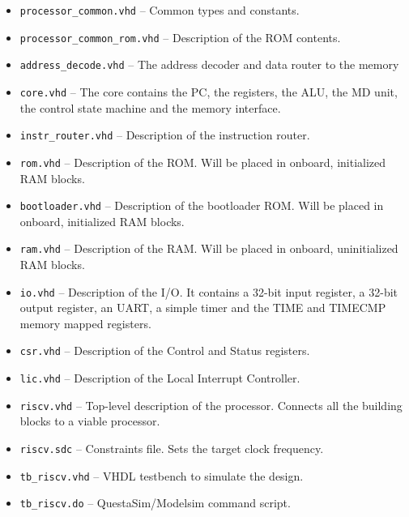\documentclass[12pt]{article}
\begin{document}
\begin{itemize}
\item \lstinline|processor_common.vhd| -- Common types and constants.
\item \lstinline|processor_common_rom.vhd| -- Description of the ROM contents.
\item \lstinline|address_decode.vhd| -- The address decoder and data router to the memory \item \lstinline|core.vhd| -- The core contains the PC, the registers, the ALU, the MD unit, the control state machine and the memory interface.
\item \lstinline|instr_router.vhd| -- Description of the instruction router.
\item \lstinline|rom.vhd| -- Description of the ROM. Will be placed in onboard, initialized RAM blocks. 
\item \lstinline|bootloader.vhd| -- Description of the bootloader ROM. Will be placed in onboard, initialized RAM blocks. 
\item \lstinline|ram.vhd| -- Description of the RAM. Will be placed in onboard, uninitialized RAM blocks. 
\item \lstinline|io.vhd| -- Description of the I/O. It contains a 32-bit input register, a 32-bit output register, an UART, a simple timer and the TIME and TIMECMP memory mapped registers.
\item \lstinline|csr.vhd| -- Description of the Control and Status registers.
\item \lstinline|lic.vhd| -- Description of the Local Interrupt Controller.
\item \lstinline|riscv.vhd| -- Top-level description of the processor. Connects all the building blocks to a viable processor.
\item \lstinline|riscv.sdc| -- Constraints file. Sets the target clock frequency.
\item \lstinline|tb_riscv.vhd| -- VHDL testbench to simulate the design.
\item \lstinline|tb_riscv.do| -- QuestaSim/Modelsim command script.
\end{itemize}
\end{document}

